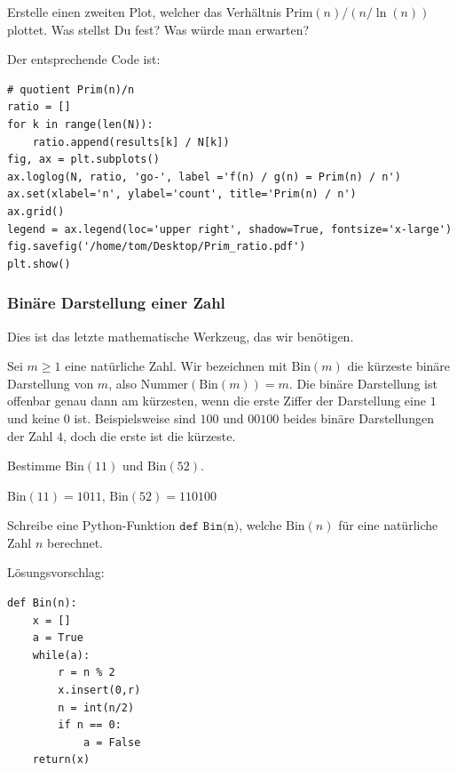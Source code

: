 \begin{Exercise}
Erstelle einen zweiten Plot, welcher das Verhältnis $\text{Prim}(n) / (n / \ln{(n)})$ plottet. Was stellst Du fest? Was würde man erwarten?
\end{Exercise}

\begin{Answer}

Der entsprechende Code ist:
\begin{verbatim}
# quotient Prim(n)/n
ratio = []
for k in range(len(N)):
    ratio.append(results[k] / N[k])
fig, ax = plt.subplots()
ax.loglog(N, ratio, 'go-', label ='f(n) / g(n) = Prim(n) / n')
ax.set(xlabel='n', ylabel='count', title='Prim(n) / n')
ax.grid()
legend = ax.legend(loc='upper right', shadow=True, fontsize='x-large')
fig.savefig('/home/tom/Desktop/Prim_ratio.pdf')
plt.show()
\end{verbatim}
\end{Answer}



\subsubsection{Binäre Darstellung einer Zahl}
Dies ist das letzte mathematische Werkzeug, das wir benötigen.

Sei $m\geq 1$ eine natürliche Zahl. Wir bezeichnen mit $\text{Bin}(m)$ die kürzeste binäre Darstellung von $m$, also $\text{Nummer}(\text{Bin}(m)) = m$. Die binäre Darstellung ist offenbar genau dann am kürzesten, wenn die erste Ziffer der Darstellung eine $1$ und keine $0$ ist. Beispielsweise sind $100$ und $00100$ beides binäre Darstellungen der Zahl $4$, doch die erste ist die kürzeste.


\begin{Exercise}
Bestimme $\text{Bin}(11)$ und $\text{Bin}(52)$.
\end{Exercise}

\begin{Answer}
$\text{Bin}(11) = 1011$, $\text{Bin}(52) = 110100$
\end{Answer}



\begin{Exercise}
Schreibe eine Python-Funktion $\texttt{def Bin(n)}$, welche $\text{Bin}(n)$ für eine natürliche Zahl $n$ berechnet.
\end{Exercise}

\begin{Answer}
Lösungsvorschlag:
\begin{verbatim}
def Bin(n):
    x = []
    a = True
    while(a):
        r = n % 2
        x.insert(0,r)
        n = int(n/2)
        if n == 0:
            a = False
    return(x)
\end{verbatim}
\end{Answer}

